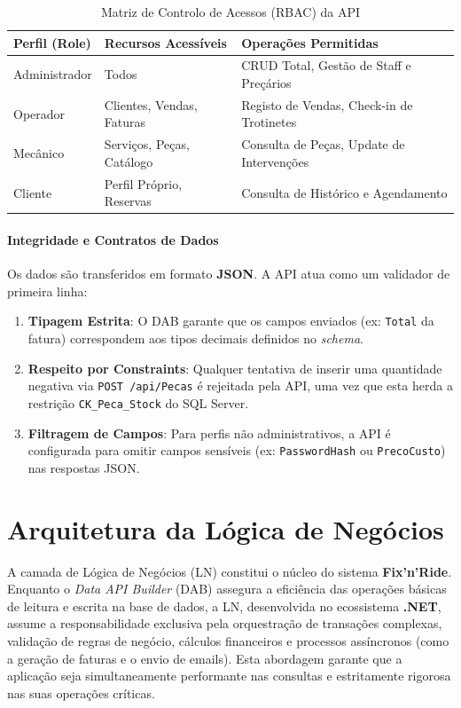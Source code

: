 \documentclass[a4paper,12pt]{scrreprt}
\begin{document}
\begin{table}[h!]
\centering
\begin{tabular}{|l|l|l|}
\hline
\textbf{Perfil (Role)} & \textbf{Recursos Acessíveis} & \textbf{Operações Permitidas} \\ \hline
Administrador & Todos & CRUD Total, Gestão de Staff e Preçários \\ \hline
Operador & Clientes, Vendas, Faturas & Registo de Vendas, Check-in de Trotinetes \\ \hline
Mecânico & Serviços, Peças, Catálogo & Consulta de Peças, Update de Intervenções \\ \hline
Cliente & Perfil Próprio, Reservas & Consulta de Histórico e Agendamento \\ \hline
\end{tabular}
\caption{Matriz de Controlo de Acessos (RBAC) da API}
\end{table}

\subsubsection{Integridade e Contratos de Dados}
Os dados são transferidos em formato \textbf{JSON}. A API atua como um validador de primeira linha:
\begin{enumerate}
    \item \textbf{Tipagem Estrita}: O DAB garante que os campos enviados (ex: \texttt{Total} da fatura) correspondem aos tipos decimais definidos no \textit{schema}.
    \item \textbf{Respeito por Constraints}: Qualquer tentativa de inserir uma quantidade negativa via \texttt{POST /api/Pecas} é rejeitada pela API, uma vez que esta herda a restrição \texttt{CK\_Peca\_Stock} do SQL Server.
    \item \textbf{Filtragem de Campos}: Para perfis não administrativos, a API é configurada para omitir campos sensíveis (ex: \texttt{PasswordHash} ou \texttt{PrecoCusto}) nas respostas JSON.
\end{enumerate}

\chapter{Arquitetura da Lógica de Negócios}

A camada de Lógica de Negócios (LN) constitui o núcleo do sistema \textbf{Fix'n'Ride}. Enquanto o \textit{Data API Builder} (DAB) assegura a eficiência das operações básicas de leitura e escrita na base de dados, a LN, desenvolvida no ecossistema \textbf{.NET}, assume a responsabilidade exclusiva pela orquestração de transações complexas, validação de regras de negócio, cálculos financeiros e processos assíncronos (como a geração de faturas e o envio de emails). Esta abordagem garante que a aplicação seja simultaneamente performante nas consultas e estritamente rigorosa nas suas operações críticas.
\end{document}
